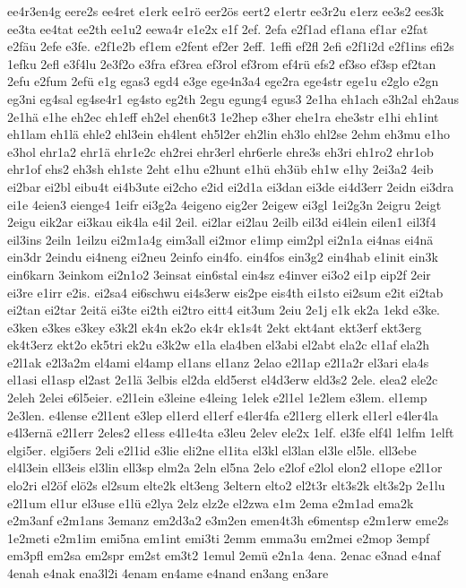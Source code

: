 {ee4r3en4g
eere2s
ee4ret
e1erk
ee1rö
eer2ös
eert2
e1ertr
ee3r2u
e1erz
ee3s2
ees3k
ee3ta
ee4tat
ee2th
ee1u2
eewa4r
e1e2x
e1f
2ef.
2efa
e2f1ad
ef1ana
ef1ar
e2fat
e2fäu
2efe
e3fe.
e2f1e2b
ef1em
e2fent
ef2er
2eff.
1effi
ef2fl
2efi
e2f1i2d
e2f1ins
efi2s
1efku
2efl
e3f4lu
2e3f2o
e3fra
ef3rea
ef3rol
ef3rom
ef4rü
efs2
ef3so
ef3sp
ef2tan
2efu
e2fum
2efü
e1g
egas3
egd4
e3ge
ege4n3a4
ege2ra
ege4str
ege1u
e2glo
e2gn
eg3ni
eg4sal
eg4se4r1
eg4sto
eg2th
2egu
egung4
egus3
2e1ha
eh1ach
e3h2al
eh2aus
2e1hä
e1he
eh2ec
eh1eff
eh2el
ehen6t3
1e2hep
e3her
ehe1ra
ehe3str
e1hi
eh1int
eh1lam
eh1lä
ehle2
ehl3ein
eh4lent
eh5l2er
eh2lin
eh3lo
ehl2se
2ehm
eh3mu
e1ho
e3hol
ehr1a2
ehr1ä
ehr1e2c
eh2rei
ehr3erl
ehr6erle
ehre3s
eh3ri
eh1ro2
ehr1ob
ehr1of
ehs2
eh3sh
eh1ste
2eht
e1hu
e2hunt
e1hü
eh3üb
eh1w
e1hy
2ei3a2
4eib
ei2bar
ei2bl
eibu4t
ei4b3ute
ei2cho
e2id
ei2d1a
ei3dan
ei3de
ei4d3err
2eidn
ei3dra
ei1e
4eien3
eienge4
1eifr
ei3g2a
4eigeno
eig2er
2eigew
ei3gl
1ei2g3n
2eigru
2eigt
2eigu
eik2ar
ei3kau
eik4la
e4il
2eil.
ei2lar
ei2lau
2eilb
eil3d
ei4lein
eilen1
eil3f4
eil3ins
2eiln
1eilzu
ei2m1a4g
eim3all
ei2mor
e1imp
eim2pl
ei2n1a
ei4nas
ei4nä
ein3dr
2eindu
ei4neng
ei2neu
2einfo
ein4fo.
ein4fos
ein3g2
ein4hab
e1init
ein3k
ein6karn
3einkom
ei2n1o2
3einsat
ein6stal
ein4sz
e4inver
ei3o2
ei1p
eip2f
2eir
ei3re
e1irr
e2is.
ei2sa4
ei6schwu
ei4s3erw
eis2pe
eis4th
ei1sto
ei2sum
e2it
ei2tab
ei2tan
ei2tar
2eitä
ei3te
ei2th
ei2tro
eitt4
eit3um
2eiu
2e1j
e1k
ek2a
1ekd
e3ke.
e3ken
e3kes
e3key
e3k2l
ek4n
ek2o
ek4r
ek1s4t
2ekt
ekt4ant
ekt3erf
ekt3erg
ek4t3erz
ekt2o
ek5tri
ek2u
e3k2w
e1la
ela4ben
el3abi
el2abt
ela2c
el1af
ela2h
e2l1ak
e2l3a2m
el4ami
el4amp
el1ans
el1anz
2elao
e2l1ap
e2l1a2r
el3ari
ela4s
el1asi
el1asp
el2ast
2e1lä
3elbis
el2da
eld5erst
el4d3erw
eld3s2
2ele.
elea2
ele2c
2eleh
2elei
e6l5eier.
e2l1ein
e3leine
e4leing
1elek
e2l1el
1e2lem
e3lem.
el1emp
2e3len.
e4lense
e2l1ent
e3lep
el1erd
el1erf
e4ler4fa
e2l1erg
el1erk
el1erl
e4ler4la
e4l3ernä
e2l1err
2eles2
el1ess
e4l1e4ta
e3leu
2elev
ele2x
1elf.
el3fe
elf4l
1elfm
1elft
elgi5er.
elgi5ers
2eli
e2l1id
e3lie
eli2ne
el1ita
el3kl
el3lan
el3le
el5le.
ell3ebe
el4l3ein
ell3eis
el3lin
ell3sp
elm2a
2eln
el5na
2elo
e2lof
e2lol
elon2
el1ope
e2l1or
elo2ri
el2öf
elö2s
el2sum
elte2k
elt3eng
3eltern
elto2
el2t3r
elt3s2k
elt3s2p
2e1lu
e2l1um
el1ur
el3use
e1lü
e2lya
2elz
elz2e
el2zwa
e1m
2ema
e2m1ad
ema2k
e2m3anf
e2m1ans
3emanz
em2d3a2
e3m2en
emen4t3h
e6mentsp
e2m1erw
eme2s
1e2meti
e2m1im
emi5na
em1int
emi3ti
2emm
emma3u
em2mei
e2mop
3empf
em3pfl
em2sa
em2spr
em2st
em3t2
1emul
2emü
e2n1a
4ena.
2enac
e3nad
e4naf
4enah
e4nak
ena3l2i
4enam
en4ame
e4nand
en3ang
en3are
}
